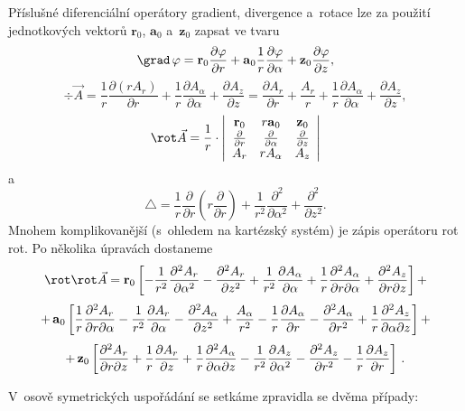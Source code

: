 Příslušné diferenciální operátory gradient, divergence a~rotace lze za použití jednotkových vektorů $\textbf{r}_0$, $\textbf{a}_0$ a~$\textbf{z}_0$ zapsat ve tvaru
$$
\grad \,\varphi=\mbox{\textbf{r}}_0 \frac{\partial\varphi}{\partial r}
+\mbox{\textbf{a}}_0\frac{1}{r}\frac{\partial\varphi}{\partial \alpha}+
\mbox{\textbf{z}}_0\frac{\partial\varphi}{\partial z},
$$
$$
\div \vec A = \frac{1}{r}\frac{\partial (rA_r)}{\partial r}+
\frac{1}{r}\frac{\partial A_\alpha}{\partial \alpha}+\frac{\partial A_z}{\partial z} = 
\frac{\partial A_r}{\partial r} + \frac{A_r}{r} +
\frac{1}{r}\frac{\partial A_\alpha}{\partial \alpha}+\frac{\partial A_z}{\partial z},
$$
$$
\rot \vec A = \frac{1}{r}\cdot
\left|
\begin{array}{ccc}
  \mbox{\textbf{r}}_0 & r\mbox{\textbf{a}}_0 & \mbox{\textbf{z}}_0 \\
  \frac{\partial}{\partial r} & \frac{\partial}{\partial \alpha} & \frac{\partial}{\partial z} \\
  A_r & rA_\alpha & A_z
\end{array}
\right|
$$
a~$$
\triangle = \frac{1}{r}\frac{\partial}{\partial r}\left(r
\frac{\partial}{\partial r}\right) + \frac{1}{r^2}\frac{\partial^2}{\partial \alpha^2} + \frac{\partial^2}{\partial z^2}.
$$
Mnohem komplikovanější (s~ohledem na kartézský systém) je zápis operátoru rot rot. Po několika úpravách dostaneme
$$
\rot \rot \vec A = \mbox{\textbf{r}}_0\left[-\frac{1}{r^2}\frac{\partial^2 A_r}
{\partial \alpha^2}-\frac{\partial^2 A_r}{\partial z^2}+\frac{1}{r^2}\frac{\partial A_\alpha}
{\partial \alpha}+\frac{1}{r}\frac{\partial^2 A_\alpha}{\partial r\partial \alpha}+
\frac{\partial^2 A_z}{\partial r \partial z}\right]+
$$
$$
+\,\mbox{\textbf{a}}_0\left[\frac{1}{r}\frac{\partial^2 A_r}
{\partial r \partial\alpha}-\frac{1}{r^2}\frac{\partial A_r}{\partial \alpha}-
\frac{\partial^2 A_\alpha}{\partial z^2}+\frac{A_\alpha}{r^2}-\frac{1}{r}\frac{\partial A_\alpha}
{\partial r}-\frac{\partial^2 A_\alpha}{\partial r^2}+\frac{1}{r}\frac{\partial^2 A_z}
{\partial \alpha \partial z}\right]+
$$
$$
+\,\mbox{\textbf{z}}_0\left[\frac{\partial^2 A_r}{\partial r \partial z}+\frac{1}{r}
\frac{\partial A_r}{\partial z}+\frac{1}{r}\frac{\partial^2 A_\alpha}{\partial \alpha \partial z}-
\frac{1}{r^2}\frac{\partial A_z}{\partial \alpha^2}-
\frac{\partial^2 A_z}{\partial r^2}-\frac{1}{r}\frac{\partial A_z}{\partial r}\right]\,.
$$

V~osově symetrických uspořádání se setkáme zpravidla se dvěma případy:

